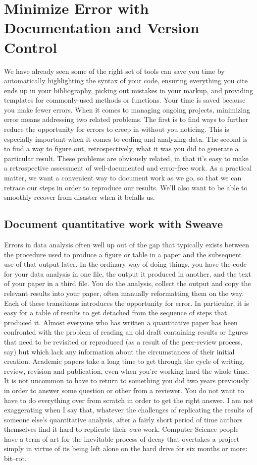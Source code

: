 \documentclass[11pt,article,oneside]{memoir}
\begin{document}
\section{Minimize Error with Documentation and Version Control}  
We have already seen some of the right set of tools can save you time by automatically highlighting the syntax of your code, ensuring everything you cite ends up in your bibliography, picking out mistakes in your markup, and providing templates for commonly-used methods or functions. Your time is saved because you make fewer errors. When it comes to managing ongoing projects, minimizing error means addressing two related problems. The first is to find ways to further reduce the opportunity for errors to creep in without you noticing. This is especially important when it comes to coding and analyzing data. The second is to find a way to figure out, retrospectively, what it was you did to generate a particular result. These problems are obviously related, in that it's easy to make a retrospective assessment of  well-documented and error-free work. As a practical matter, we want a convenient way to document work as we go, so that we can retrace our steps in order to reproduce our results. We'll also want to be able to smoothly recover from disaster when it befalls us.

\subsection{Document quantitative work with Sweave} 
Errors in data analysis often well up out of the gap that typically exists between the procedure used to produce a figure or table in a paper and the subsequent use of that output later. In the ordinary way of doing things, you have the code for your data analysis in one file, the output it produced in another, and the text of your paper in a third file. You do the analysis, collect the output and copy the relevant results into your paper, often manually reformatting them on the way. Each of these transitions introduces the opportunity for error. In particular, it is easy for a table of results to get detached from the sequence of steps that produced it. Almost everyone who has written a quantitative paper has been confronted with the problem of reading an old draft containing results or figures that need to be revisited or reproduced (as a result of the peer-review process, say) but which lack any information about the circumstances of their initial creation. Academic papers take a long time to get through the cycle of writing, review, revision and publication, even when you're working hard the whole time. It is not uncommon to have to return to something you did two years previously in order to answer some question or other from a reviewer. You do not want to have to do everything over from scratch in order to get the right answer. I am not exaggerating when I say that, whatever the challenges of replicating the results of someone else's quantitative analysis, after a fairly short period of time authors themselves find it hard to replicate their \emph{own} work. Computer Science people have a term of art for the inevitable process of decay that overtakes a project simply in virtue of its being left alone on the hard drive for six months or more: bit--rot.
\end{document}

